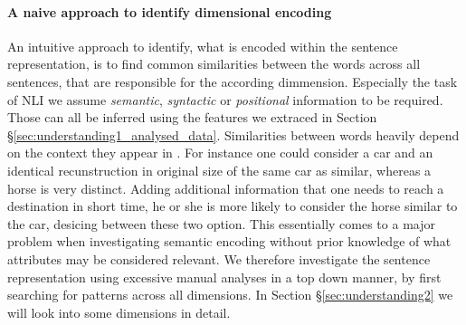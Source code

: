 \paragraph*{A naive approach to identify dimensional encoding}
An intuitive approach to identify, what is encoded within the sentence representation, is to find common similarities between the words across all sentences, that are responsible for the according dimmension. Especially the task of \ac{NLI} we assume \textit{semantic}, \textit{syntactic} or \textit{positional} information to be required. Those can all be inferred using the features we extraced in Section §\ref{sec:understanding1_analysed_data}. Similarities between words heavily depend on the context they appear in \citep{dagan2000contextual}. For instance one could consider a car and an identical recunstruction in original size of the same car as similar, whereas a horse is very distinct. Adding additional information that one needs to reach a destination in short time, he or she is more likely to consider the horse similar to the car, desicing between these two option. This essentially comes to a major problem when investigating semantic encoding without prior knowledge of what attributes may be considered relevant. We therefore investigate the sentence representation using excessive manual analyses in a top down manner, by first searching for patterns across all dimensions. In Section §\ref{sec:understanding2} we will look into some dimensions in detail.
